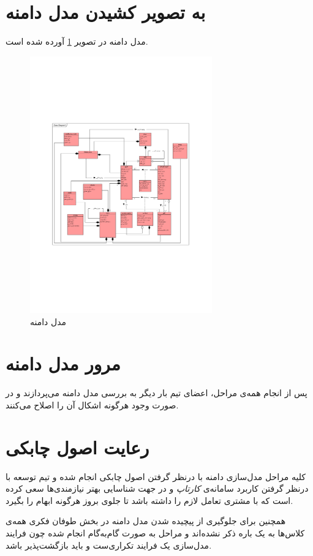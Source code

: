 \section{به تصویر کشیدن مدل دامنه}
مدل دامنه در تصویر \ref{pic:dm} آورده شده است.
\begin{figure}[h]
	\begin{center}
		\includegraphics[width=0.7\textwidth, height=0.5\textheight, angle=90]{./images/dm}
	\end{center}
\caption{مدل دامنه}
\label{pic:dm}
\end{figure}
\section{مرور مدل دامنه}
پس از انجام همه‌ی مراحل، اعضای تیم بار دیگر به بررسی مدل دامنه می‌پردازند و در صورت وجود هرگونه اشکال آن را اصلاح می‌کنند.

\section{رعایت اصول چابکی}
کلیه مراحل مدل‌سازی دامنه با درنظر گرفتن اصول چابکی انجام شده و تیم توسعه با درنظر گرفتن کاربرد سامانه‌ی \textit{کارتاپ} و در جهت شناسایی بهتر نیازمندی‌ها سعی کرده است که با مشتری تعامل لازم را داشته باشد تا جلوی بروز هرگونه ابهام را بگیرد.

همچنین برای جلوگیری از پیچیده‌ شدن مدل دامنه در بخش طوفان فکری همه‌ی کلاس‌ها به یک باره ذکر نشده‌اند و مراحل به صورت گام‌به‌گام انجام شده چون فرایند مدل‌سازی یک فرایند تکراری‌ست و باید بازگشت‌پذیر باشد.